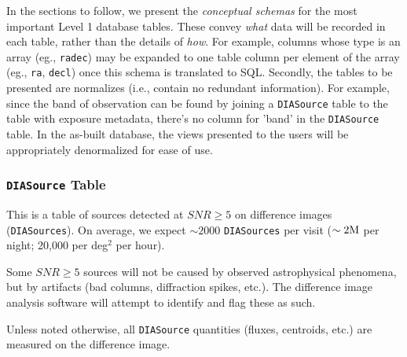 \documentclass[12pt]{article}
\newcommand{\code}[1]{\texttt{#1}}
\newcommand{\DIASource}{\code{DIASource}\xspace}
\newcommand{\DIASources}{\code{DIASources}\xspace}
\newcommand{\DB}{{Level 1 database}\xspace}
\begin{document}
\vspace{2em}

In the sections to follow, we present the {\em conceptual schemas} for the most important \DB tables. These convey {\em what} data will be recorded in each table, rather than the details of {\em how}. For example, columns whose type is an array (eg., \texttt{radec}) may be expanded to one table column per element of the array (eg., \texttt{ra}, \texttt{decl}) once this schema is translated to SQL. Secondly, the tables to be presented are normalizes (i.e., contain no redundant information). For example, since the band of observation can be found by joining a \DIASource table to the table with exposure metadata, there's no column for 'band' in the \DIASource table. In the as-built database, the views presented to the users will be appropriately denormalized for ease of use.

\subsubsection{\DIASource Table}

This is a table of sources detected at $SNR \geq 5$ on difference images (\DIASources). On average, we expect $\sim 2000$ \DIASources per visit ($\sim 2{\rm M}$ per night; 20,000 per deg$^2$ per hour).

Some $SNR \geq 5$ sources will not be caused by observed astrophysical phenomena, but by artifacts (bad columns, diffraction spikes, etc.). The difference image analysis software will attempt to identify and flag these as such.

Unless noted otherwise, all \DIASource quantities (fluxes, centroids, etc.) are measured on the difference image.
\end{document}
